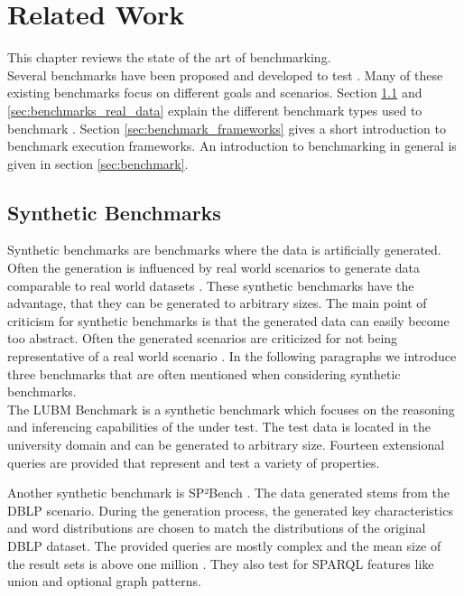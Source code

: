 \chapter{Related Work}
\label{ch:related_work}

This chapter reviews the state of the art of \ts{} benchmarking.\\

Several benchmarks have been proposed and developed to test \tsp{} \cite{alucDiversifiedStressTesting2014, guoLUBMBenchmarkOWL2005, morseyDBpediaSPARQLBenchmark2011, saleemFEASIBLEFeatureBasedSPARQL2015, schmidtSP2BenchSPARQLPerformance2008}.
Many of these existing benchmarks focus on different goals and scenarios.
Section \ref{sec:synthetic_benchmarks} and \ref{sec:benchmarks_real_data} explain the different benchmark types used to benchmark \tsp{}.
Section \ref{sec:benchmark_frameworks} gives a short introduction to benchmark execution frameworks.
An introduction to benchmarking in general is given in section \ref{sec:benchmark}.

\section{Synthetic Benchmarks}
\label{sec:synthetic_benchmarks}
Synthetic benchmarks are benchmarks where the data is artificially generated.
Often the generation is influenced by real world scenarios to generate data comparable to real world datasets \cite{guoLUBMBenchmarkOWL2005}.
These synthetic benchmarks have the advantage, that they can be generated to arbitrary sizes.
The main point of criticism for synthetic benchmarks is that the generated data can easily become too abstract.
Often the generated scenarios are criticized for not being representative of a real world scenario \cite{saleemFEASIBLEFeatureBasedSPARQL2015}.
In the following paragraphs we introduce three benchmarks that are often mentioned when considering synthetic \ts{} benchmarks.
\\

The LUBM Benchmark \cite{guoLUBMBenchmarkOWL2005} is a synthetic benchmark which focuses on the reasoning and inferencing capabilities of the \tsp{} under test.
The test data is located in the university domain and can be generated to arbitrary size.
Fourteen extensional queries are provided that represent and test a variety of properties.

Another synthetic benchmark is SP²Bench \cite{schmidtSP2BenchSPARQLPerformance2008}.
The data generated stems from the DBLP scenario. 
During the generation process, the generated key characteristics and word distributions are chosen to match the distributions of the original DBLP dataset.
The provided queries are mostly complex and the mean size of the result sets is above one million \cite{saleemFEASIBLEFeatureBasedSPARQL2015}.
They also test for SPARQL features like union and optional graph patterns.

